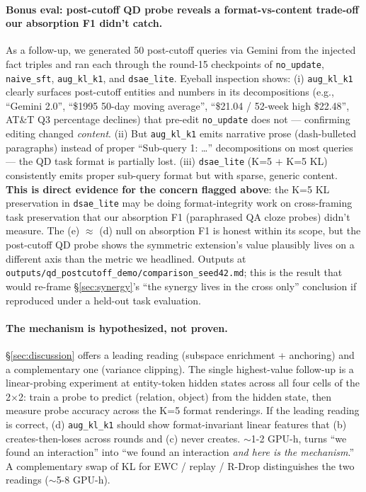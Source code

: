 \documentclass[11pt]{article}
\newcommand{\code}[1]{\texttt{\small #1}}
\begin{document}
\paragraph{Bonus eval: post-cutoff QD probe reveals a format-vs-content trade-off our absorption F1 didn't catch.}
As a follow-up, we generated 50 post-cutoff queries via Gemini from the
injected fact triples and ran each through the round-15 checkpoints of
\code{no\_update}, \code{naive\_sft}, \code{aug\_kl\_k1}, and
\code{dsae\_lite}. Eyeball inspection shows: (i) \code{aug\_kl\_k1}
clearly surfaces post-cutoff entities and numbers in its decompositions
(e.g., ``Gemini 2.0'', ``\$1995 50-day moving average'', ``\$21.04 /
52-week high \$22.48'', AT\&T Q3 percentage declines) that pre-edit
\code{no\_update} does not --- confirming editing changed
\emph{content}. (ii) But \code{aug\_kl\_k1} emits narrative prose
(dash-bulleted paragraphs) instead of proper ``Sub-query 1: \dots''
decompositions on most queries --- the QD task format is partially
lost. (iii) \code{dsae\_lite} (K=5 + K=5 KL) consistently emits proper
sub-query format but with sparse, generic content. \textbf{This is
direct evidence for the concern flagged above}: the K=5 KL preservation
in \code{dsae\_lite} may be doing format-integrity work on cross-framing
task preservation that our absorption F1 (paraphrased QA cloze probes)
didn't measure. The (e) $\approx$ (d) null on absorption F1 is honest
within its scope, but the post-cutoff QD probe shows the symmetric
extension's value plausibly lives on a different axis than the metric we
headlined. Outputs at
\code{outputs/qd\_postcutoff\_demo/comparison\_seed42.md}; this is the
result that would re-frame \S\ref{sec:synergy}'s ``the synergy lives in
the cross only'' conclusion if reproduced under a held-out task
evaluation.

\paragraph{The mechanism is hypothesized, not proven.}
\S\ref{sec:discussion} offers a leading reading (subspace enrichment +
anchoring) and a complementary one (variance clipping). The single
highest-value follow-up is a linear-probing experiment at entity-token
hidden states across all four cells of the 2$\times$2: train a probe to
predict (relation, object) from the hidden state, then measure probe
accuracy across the K=5 format renderings. If the leading reading is
correct, (d) \code{aug\_kl\_k1} should show format-invariant linear
features that (b) creates-then-loses across rounds and (c) never creates.
$\sim$1-2 GPU-h, turns ``we found an interaction'' into ``we found an
interaction \emph{and here is the mechanism}.'' A complementary swap of KL
for EWC / replay / R-Drop distinguishes the two readings ($\sim$5-8
GPU-h).
\end{document}
